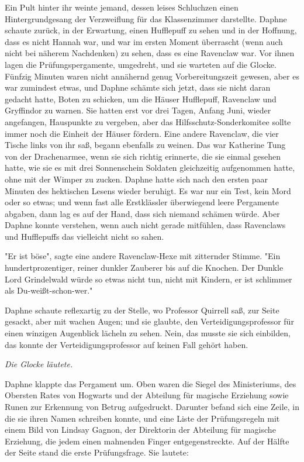 {Ein Pult hinter ihr weinte jemand, dessen leises Schluchzen einen Hintergrundgesang der Verzweiflung für das Klassenzimmer darstellte. Daphne schaute zurück, in der Erwartung, einen Hufflepuff zu sehen und in der Hoffnung, dass es nicht Hannah war, und war im ersten Moment überrascht (wenn auch nicht bei näherem Nachdenken) zu sehen, dass es eine Ravenclaw war. Vor ihnen lagen die Prüfungspergamente, umgedreht, und sie warteten auf die Glocke. Fünfzig Minuten waren nicht annähernd genug Vorbereitungszeit gewesen, aber es war zumindest etwas, und Daphne schämte sich jetzt, dass sie nicht daran gedacht hatte, Boten zu schicken, um die Häuser Hufflepuff, Ravenclaw und Gryffindor zu warnen. Sie hatten erst vor drei Tagen, Anfang Juni, wieder angefangen, Hauspunkte zu vergeben, aber das Hilfsschutz-Sonderkomitee sollte immer noch die Einheit der Häuser fördern. Eine andere Ravenclaw, die vier Tische links von ihr saß, begann ebenfalls zu weinen. Das war Katherine Tung von der Drachenarmee, wenn sie sich richtig erinnerte, die sie einmal gesehen hatte, wie sie es mit drei Sonnenschein Soldaten gleichzeitig aufgenommen hatte, ohne mit der Wimper zu zucken. Daphne hatte sich nach den ersten paar Minuten des hektischen Lesens wieder beruhigt. Es war nur ein Test, kein Mord oder so etwas; und wenn fast alle Erstklässler überwiegend leere Pergamente abgaben, dann lag es auf der Hand, dass sich niemand schämen würde. Aber Daphne konnte verstehen, wenn auch nicht gerade mitfühlen, dass Ravenclaws und Hufflepuffs das vielleicht nicht so sahen.

"Er ist böse", sagte eine andere Ravenclaw-Hexe mit zitternder Stimme. "Ein hundertprozentiger, reiner dunkler Zauberer bis auf die Knochen. Der Dunkle Lord Grindelwald würde so etwas nicht tun, nicht mit Kindern, er ist schlimmer als Du-weißt-schon-wer."

Daphne schaute reflexartig zu der Stelle, wo Professor Quirrell saß, zur Seite gesackt, aber mit wachen Augen; und sie glaubte, den Verteidigungsprofessor für einen winzigen Augenblick lächeln zu sehen. Nein, das musste sie sich einbilden, das konnte der Verteidigungsprofessor auf keinen Fall gehört haben.

\emph{Die Glocke läutete.}

Daphne klappte das Pergament um. Oben waren die Siegel des Ministeriums, des Obersten Rates von Hogwarts und der Abteilung für magische Erziehung sowie Runen zur Erkennung von Betrug aufgedruckt. Darunter befand sich eine Zeile, in die sie ihren Namen schreiben konnte, und eine Liste der Prüfungsregeln mit einem Bild von Lindsay Gagnon, der Direktorin der Abteilung für magische Erziehung, die jedem einen mahnenden Finger entgegenstreckte. Auf der Hälfte der Seite stand die erste Prüfungsfrage. Sie lautete:

}
